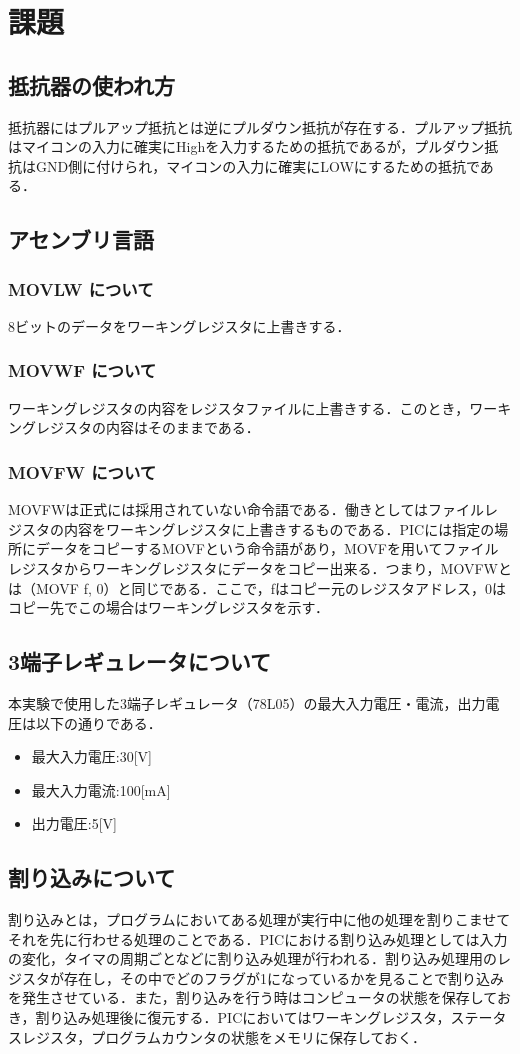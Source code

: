 \documentclass[11pt,a4paper]{jsarticle}
\begin{document}
\newpage
 \section{課題}
  \subsection{抵抗器の使われ方}
  抵抗器にはプルアップ抵抗とは逆にプルダウン抵抗が存在する．プルアップ抵抗はマイコンの入力に確実にHighを入力するための抵抗であるが，プルダウン抵抗はGND側に付けられ，マイコンの入力に確実にLOWにするための抵抗である．

  \subsection{アセンブリ言語}
   \subsubsection{MOVLW について}
   8ビットのデータをワーキングレジスタに上書きする．
   \subsubsection{MOVWF について}
   ワーキングレジスタの内容をレジスタファイルに上書きする．このとき，ワーキングレジスタの内容はそのままである．
   \subsubsection{MOVFW について}
   MOVFWは正式には採用されていない命令語である．働きとしてはファイルレジスタの内容をワーキングレジスタに上書きするものである．PICには指定の場所にデータをコピーするMOVFという命令語があり，MOVFを用いてファイルレジスタからワーキングレジスタにデータをコピー出来る．つまり，MOVFWとは（MOVF f, 0）と同じである．ここで，fはコピー元のレジスタアドレス，0はコピー先でこの場合はワーキングレジスタを示す．

  \subsection{3端子レギュレータについて}
   本実験で使用した3端子レギュレータ（78L05）の最大入力電圧・電流，出力電圧は以下の通りである．
    \begin{itemize}
     \item 最大入力電圧:30[V]
     \item 最大入力電流:100[mA]
     \item 出力電圧:5[V]
    \end{itemize}

  \subsection{割り込みについて}
  割り込みとは，プログラムにおいてある処理が実行中に他の処理を割りこませてそれを先に行わせる処理のことである．PICにおける割り込み処理としては入力の変化，タイマの周期ごとなどに割り込み処理が行われる．割り込み処理用のレジスタが存在し，その中でどのフラグが1になっているかを見ることで割り込みを発生させている．また，割り込みを行う時はコンピュータの状態を保存しておき，割り込み処理後に復元する．PICにおいてはワーキングレジスタ，ステータスレジスタ，プログラムカウンタの状態をメモリに保存しておく．
\end{document}
